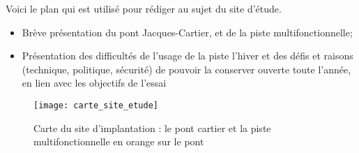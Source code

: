 \par Voici le plan qui est utilisé pour rédiger au sujet du site d'étude.
\begin{itemize}
   \item Brève présentation du pont Jacques-Cartier, et de la piste multifonctionnelle;
   \item Présentation des difficultés de l'usage de la piste l'hiver et des défis et raisons (technique, politique, sécurité) de pouvoir la conserver ouverte toute l'année, en lien avec les objectifs de l'essai 
\end{itemize}
\label{carte_site_etude}
\begin{figure}
    \centering
    \texttt{[image: carte\_site\_etude]}
    \caption{Carte du site d'implantation : le pont cartier et la piste multifonctionnelle en orange sur le pont}
    \label{fig:carte_site_etude}
\end{figure}
